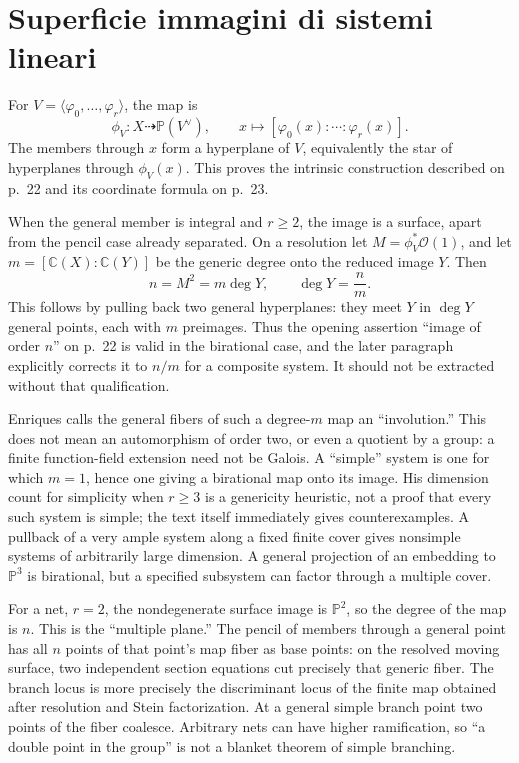 \section{Superficie immagini di sistemi lineari}
\label{enriques-I-6}

For \(V=\langle\varphi_0,\ldots,\varphi_r\rangle\), the map is \[
\phi_V:X\dashrightarrow\mathbb P(V^\vee),\qquad
x\longmapsto[\varphi_0(x):\cdots:\varphi_r(x)].
\] The members through \(x\) form a hyperplane of \(V\), equivalently the star of hyperplanes through \(\phi_V(x)\). This proves the intrinsic construction described on p.~22 and its coordinate formula on p.~23.

When the general member is integral and \(r\ge2\), the image is a surface, apart from the pencil case already separated. On a resolution let \(M=\phi_V^*\mathcal O(1)\), and let \(m=[\mathbb C(X):\mathbb C(Y)]\) be the generic degree onto the reduced image \(Y\). Then \[
n=M^2=m\deg Y,\qquad \deg Y=\frac n m.
\] This follows by pulling back two general hyperplanes: they meet \(Y\) in \(\deg Y\) general points, each with \(m\) preimages. Thus the opening assertion ``image of order \(n\)'' on p.~22 is valid in the birational case, and the later paragraph explicitly corrects it to \(n/m\) for a composite system. It should not be extracted without that qualification.

Enriques calls the general fibers of such a degree-\(m\) map an ``involution.'' This does not mean an automorphism of order two, or even a quotient by a group: a finite function-field extension need not be Galois. A ``simple'' system is one for which \(m=1\), hence one giving a birational map onto its image. His dimension count for simplicity when \(r\ge3\) is a genericity heuristic, not a proof that every such system is simple; the text itself immediately gives counterexamples. A pullback of a very ample system along a fixed finite cover gives nonsimple systems of arbitrarily large dimension. A general projection of an embedding to \(\mathbb P^3\) is birational, but a specified subsystem can factor through a multiple cover.

For a net, \(r=2\), the nondegenerate surface image is \(\mathbb P^2\), so the degree of the map is \(n\). This is the ``multiple plane.'' The pencil of members through a general point has all \(n\) points of that point's map fiber as base points: on the resolved moving surface, two independent section equations cut precisely that generic fiber. The branch locus is more precisely the discriminant locus of the finite map obtained after resolution and Stein factorization. At a general simple branch point two points of the fiber coalesce. Arbitrary nets can have higher ramification, so ``a double point in the group'' is not a blanket theorem of simple branching.

